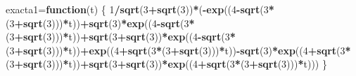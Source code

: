 \documentclass[]{article}
\newenvironment{Shaded}{\begin{snugshade}}{\end{snugshade}}
\newcommand{\KeywordTok}[1]{\textcolor[rgb]{0.13,0.29,0.53}{\textbf{#1}}}
\newcommand{\DecValTok}[1]{\textcolor[rgb]{0.00,0.00,0.81}{#1}}
\newcommand{\ControlFlowTok}[1]{\textcolor[rgb]{0.13,0.29,0.53}{\textbf{#1}}}
\newcommand{\OperatorTok}[1]{\textcolor[rgb]{0.81,0.36,0.00}{\textbf{#1}}}
\newcommand{\NormalTok}[1]{#1}
\begin{document}
\begin{Shaded}
\begin{Highlighting}[]
\NormalTok{exacta1=}\ControlFlowTok{function}\NormalTok{(t) \{}
  \DecValTok{1}\OperatorTok{/}\KeywordTok{sqrt}\NormalTok{(}\DecValTok{3}\OperatorTok{+}\KeywordTok{sqrt}\NormalTok{(}\DecValTok{3}\NormalTok{))}\OperatorTok{*}\NormalTok{(}\OperatorTok{-}\KeywordTok{exp}\NormalTok{((}\DecValTok{4}\OperatorTok{-}\KeywordTok{sqrt}\NormalTok{(}\DecValTok{3}\OperatorTok{*}\NormalTok{(}\DecValTok{3}\OperatorTok{+}\KeywordTok{sqrt}\NormalTok{(}\DecValTok{3}\NormalTok{)))}\OperatorTok{*}\NormalTok{t))}\OperatorTok{+}\KeywordTok{sqrt}\NormalTok{(}\DecValTok{3}\NormalTok{)}\OperatorTok{*}\KeywordTok{exp}\NormalTok{((}\DecValTok{4}\OperatorTok{-}\KeywordTok{sqrt}\NormalTok{(}\DecValTok{3}\OperatorTok{*}\NormalTok{(}\DecValTok{3}\OperatorTok{+}\KeywordTok{sqrt}\NormalTok{(}\DecValTok{3}\NormalTok{)))}\OperatorTok{*}\NormalTok{t))}\OperatorTok{+}\KeywordTok{sqrt}\NormalTok{(}\DecValTok{3}\OperatorTok{+}\KeywordTok{sqrt}\NormalTok{(}\DecValTok{3}\NormalTok{))}\OperatorTok{*}\KeywordTok{exp}\NormalTok{((}\DecValTok{4}\OperatorTok{-}\KeywordTok{sqrt}\NormalTok{(}\DecValTok{3}\OperatorTok{*}\NormalTok{(}\DecValTok{3}\OperatorTok{+}\KeywordTok{sqrt}\NormalTok{(}\DecValTok{3}\NormalTok{)))}\OperatorTok{*}\NormalTok{t))}\OperatorTok{+}\KeywordTok{exp}\NormalTok{((}\DecValTok{4}\OperatorTok{+}\KeywordTok{sqrt}\NormalTok{(}\DecValTok{3}\OperatorTok{*}\NormalTok{(}\DecValTok{3}\OperatorTok{+}\KeywordTok{sqrt}\NormalTok{(}\DecValTok{3}\NormalTok{)))}\OperatorTok{*}\NormalTok{t))}\OperatorTok{-}\KeywordTok{sqrt}\NormalTok{(}\DecValTok{3}\NormalTok{)}\OperatorTok{*}\KeywordTok{exp}\NormalTok{((}\DecValTok{4}\OperatorTok{+}\KeywordTok{sqrt}\NormalTok{(}\DecValTok{3}\OperatorTok{*}\NormalTok{(}\DecValTok{3}\OperatorTok{+}\KeywordTok{sqrt}\NormalTok{(}\DecValTok{3}\NormalTok{)))}\OperatorTok{*}\NormalTok{t))}\OperatorTok{+}\KeywordTok{sqrt}\NormalTok{(}\DecValTok{3}\OperatorTok{+}\KeywordTok{sqrt}\NormalTok{(}\DecValTok{3}\NormalTok{))}\OperatorTok{*}\KeywordTok{exp}\NormalTok{((}\DecValTok{4}\OperatorTok{+}\KeywordTok{sqrt}\NormalTok{(}\DecValTok{3}\OperatorTok{*}\NormalTok{(}\DecValTok{3}\OperatorTok{+}\KeywordTok{sqrt}\NormalTok{(}\DecValTok{3}\NormalTok{)))}\OperatorTok{*}\NormalTok{t)))}
\NormalTok{\}}


\end{Highlighting}
\end{Shaded}
\end{document}
